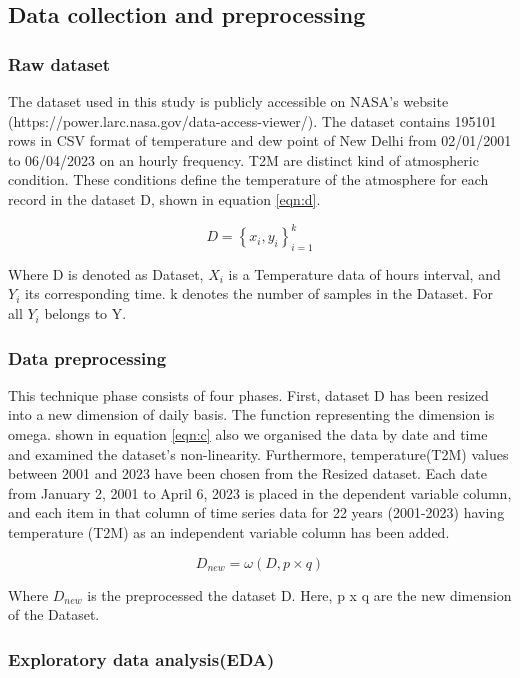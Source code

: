 \documentclass[sn-mathphys,Numbered]{sn-jnl}
\theoremstyle{thmstyleone}
\theoremstyle{thmstyletwo}
\theoremstyle{thmstylethree}
\begin{document}
\subsection{Data collection and preprocessing}
\subsubsection{Raw dataset}
The dataset used in this study is publicly accessible on NASA's website (https://power.larc.nasa.gov/data-access-viewer/). The dataset contains 195101 rows in CSV format of temperature and dew point of New Delhi from 02/01/2001 to 06/04/2023 on an hourly frequency. T2M are distinct kind of atmospheric condition. These conditions define the temperature of the atmosphere for each record in the dataset D, shown in equation \ref{eqn:d}.

\begin{equation}
\label{eqn:d}
D=\left \{ x_i, y_i \right \}_{i=1}^{k}
\end{equation}

Where D is denoted as Dataset, \(X_i\) is a Temperature data of hours interval, and \(Y_i\) its corresponding time. k denotes the number of samples in the Dataset. For all \(Y_i\) belongs to Y.

\subsubsection{Data preprocessing}
This technique phase consists of four phases. First, dataset D has been resized into a new dimension of daily basis. The function representing the dimension is omega. shown in equation \ref{eqn:c} also we organised the data by date and time and examined the dataset's non-linearity. Furthermore, temperature(T2M) values between 2001 and 2023 have been chosen from the Resized dataset. Each date from January 2, 2001 to April 6, 2023 is placed in the dependent variable column, and each item in that column of time series data for 22 years (2001-2023) having temperature (T2M) as an independent variable column has been added.

\begin{equation}
\label{eqn:c}
D_{new}=\omega \left ( D, p  \times q \right )
\end{equation}

Where \(D_{new}\) is the preprocessed the dataset D. Here,  p x q  are the new dimension of the Dataset.
\subsubsection{Exploratory data analysis(EDA)}
\end{document}
